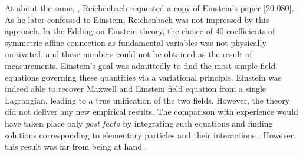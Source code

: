 \documentclass[draft]{article}
\begin{document}
At about the same, , Reichenbach requested a copy of Einstein's paper  \citep{Einstein1923c} [20 080]. As he later confessed to Einstein, Reichenbach was not impressed by this approach. In the Eddington-Einstein theory, the choice of 40 coefficients of symmetric affine connection \Gtmn as fundamental variables was not physically motivated, and these numbers could not be obtained as the result of measurements. Einstein's goal was admittedly to find the most simple field equations governing these quantities via a variational principle. Einstein was indeed able to recover Maxwell and Einstein field equation from a single Lagrangian, leading to a true unification of the two fields. However, the theory did not deliver any new empirical results. The comparison with experience would have taken place only \emph{post facto} by integrating such equations and finding solutions corresponding to elementary particles and their interactions . However, this result was far from being at hand \citep[140]{Einstein1923e}. 
\end{document}
